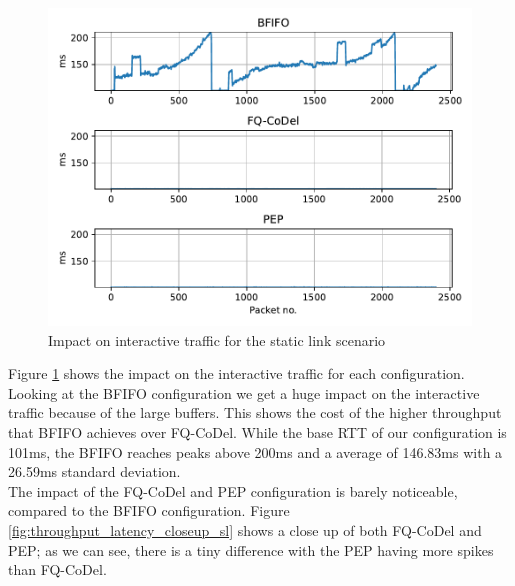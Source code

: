 \documentclass[a4paper,english, 11pt]{report}
\begin{document}
\begin{figure}[!h!] %
	\centering
	\includegraphics[scale=0.70]{../diagrams/witestlab/throughput/throughput_latency_sl.pdf}
  	\caption{Impact on interactive traffic for the static link scenario}
  	\label{fig:throughput_latency_sl}
\end{figure}

Figure \ref{fig:throughput_latency_sl} shows the impact on the interactive traffic for each configuration. 
Looking at the BFIFO configuration we get a huge impact on the interactive traffic because of the large buffers. This shows the cost of the higher throughput that BFIFO achieves over FQ-CoDel. While the base RTT of our configuration is 101ms, the BFIFO reaches peaks above 200ms and a average of 146.83ms with a 26.59ms standard deviation.\\

The impact of the FQ-CoDel and PEP configuration is barely noticeable, compared to the BFIFO configuration. Figure \ref{fig:throughput_latency_closeup_sl} shows a close up of both FQ-CoDel and PEP; as we can see, there is a tiny difference with the PEP having more spikes than FQ-CoDel.\\
\end{document}
